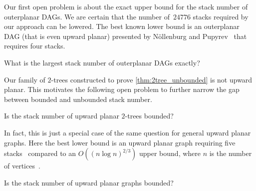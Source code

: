 \documentclass{article}
\begin{document}
Our first open problem is about the exact upper bound for the stack number of outerplanar DAGs.
We are certain that the number of~$24776$ stacks required by our approach can be lowered.
The best known lower bound is an outerplanar DAG (that is even upward planar) presented by N\"{o}llenburg and Pupyrev~\cite{Noellenburg2021_DAGsWithConstantStackNumber} that requires four stacks.

\begin{open}
    What is the largest stack number of outerplanar DAGs exactly?
\end{open}

Our family of $2$-trees constructed to prove \cref{thm:2tree_unbounded} is not upward planar.
This motivates the following open problem to further narrow the gap between bounded and unbounded stack number.

\begin{open}
    Is the stack number of upward planar $2$-trees bounded?
\end{open}

In fact, this is just a special case of the same question for general upward planar graphs.
Here the best lower bound is an upward planar graph requiring five stacks~%
compared to an $O((n \log n)^{2/3})$ upper bound, where $n$ is the number of vertices~\cite{Jungeblut2022_SublinearUpperBound}.

\begin{open}
    Is the stack number of upward planar graphs bounded?
\end{open}


\end{document}
